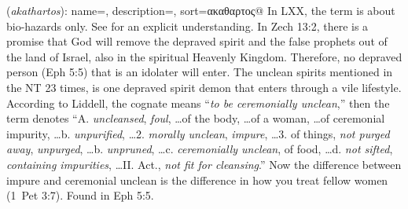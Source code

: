 \item[Depraved,]

(\textit{akathartos}):
{
    name=,
    description={},
    sort=ακαθαρτος@
}
In LXX, the term is about bio-hazards only. See  for an explicit understanding. In Zech 13:2, there is a promise that God will remove the depraved spirit and the false prophets out of the land of Israel, also in the spiritual Heavenly Kingdom. Therefore, no depraved person (Eph 5:5) that is an idolater will enter. The unclean spirits mentioned in the NT 23 times, is one depraved spirit demon that enters through a vile lifestyle. According to Liddell, the cognate  means ``\emph{to be ceremonially unclean},'' then the term  denotes ``A. \emph{uncleansed}, \emph{foul}, \ldots of the body, \ldots of a woman, \ldots of ceremonial impurity, \ldots b. \emph{unpurified}, \ldots 2. \emph{morally unclean}, \emph{impure}, \ldots 3. of things, \emph{not purged away}, \emph{unpurged}, \ldots b. \emph{unpruned}, \ldots c. \emph{ceremonially unclean}, of food, \ldots d. \emph{not sifted}, \emph{containing impurities}, \ldots II. Act., \emph{not fit for cleansing}.'' 
Now the difference between impure and ceremonial unclean is the difference in how you treat fellow women (1~Pet 3:7).
Found in Eph 5:5.
